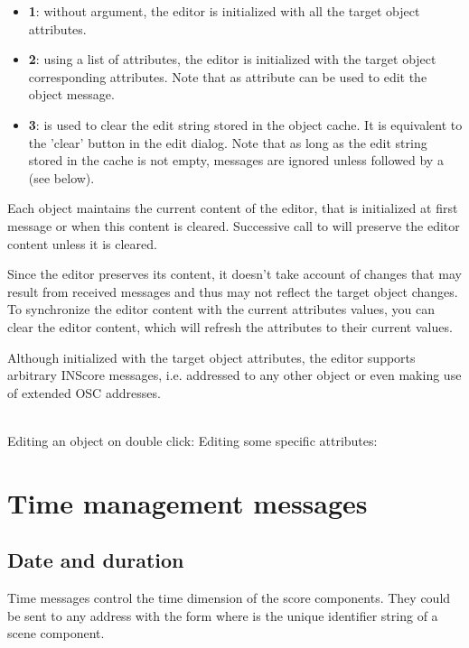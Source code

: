 \documentclass[a4paper,twoside]{report}
\newcommand{\toplevel}[1]	{\chapter{#1}}
\newcommand{\sublevel}[1]	{\section{#1}}
\begin{document}
\begin{itemize}
\item \textbf{1}: without argument, the editor is initialized with all the target object attributes.
\item \textbf{2}: using a list of attributes, the editor is initialized with the target object corresponding attributes. Note that  as attribute can be used to edit the object  message.
\item \textbf{3}:  is used to clear the edit string stored in the object cache. It is equivalent to the 'clear' button in the edit dialog. Note that as long as the edit string stored in the cache is not empty,  messages are ignored unless followed by a  (see below).
\end{itemize}

Each object maintains the current content of the editor, that is initialized at first  message or when this content is cleared. Successive call to  will preserve the editor content unless it is cleared.

\note Since the editor preserves its content, it doesn't take account of changes that may result from received messages and thus may not reflect the target object changes. To synchronize the editor content with the current attributes values, you can clear the editor content, which will refresh the attributes to their current values.

\note Although initialized with the target object attributes, the editor supports arbitrary INScore messages, i.e. addressed to any other object or even making use of extended OSC addresses.

\example \\
Editing an object on double click:
Editing some specific attributes:



\toplevel{Time management messages}
\label{time}
\sublevel{Date and duration}
\label{datedur}
Time messages control the time dimension of the score components. They could be sent to any address with the form  where  is the unique identifier string of a scene component.
\end{document}
